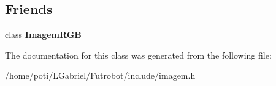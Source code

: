 \subsection*{Friends}
\begin{DoxyCompactItemize}
\item 
class {\bfseries Imagem\+R\+GB}\hypertarget{classLinhaImagemRGB_a39b57350301d2f8525a923599499846d}{}\label{classLinhaImagemRGB_a39b57350301d2f8525a923599499846d}

\end{DoxyCompactItemize}


The documentation for this class was generated from the following file\+:\begin{DoxyCompactItemize}
\item 
/home/poti/\+L\+Gabriel/\+Futrobot/include/imagem.\+h\end{DoxyCompactItemize}
